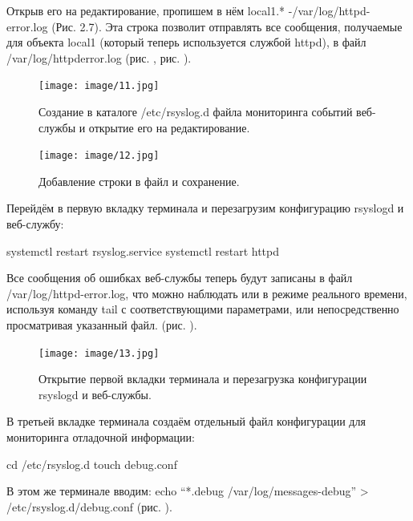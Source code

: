 \documentclass[
  english,
  russian,
  12pt,
  a4paper,
  DIV=11,
  numbers=noendperiod]{scrreprt}
\begin{document}
Открыв его на редактирование, пропишем в нём local1.*
-/var/log/httpd-error.log (Рис. 2.7). Эта строка позволит отправлять все
сообщения, получаемые для объекта local1 (который теперь используется
службой httpd), в файл /var/log/httpderror.log (рис.
\autocite*{fig:011}, рис. \autocite*{fig:012}).

\begin{figure}

{\centering \texttt{[image: image/11.jpg]}

}

\caption{Создание в каталоге /etc/rsyslog.d файла мониторинга событий
веб-службы и открытие его на редактирование.}

\end{figure}%

\begin{figure}

{\centering \texttt{[image: image/12.jpg]}

}

\caption{Добавление строки в файл и сохранение.}

\end{figure}%

Перейдём в первую вкладку терминала и перезагрузим конфигурацию rsyslogd
и веб-службу:

systemctl restart rsyslog.service systemctl restart httpd

Все сообщения об ошибках веб-службы теперь будут записаны в файл
/var/log/httpd-error.log, что можно наблюдать или в режиме реального
времени, используя команду tail с соответствующими параметрами, или
непосредственно просматривая указанный файл. (рис. \autocite*{fig:013}).

\begin{figure}

{\centering \texttt{[image: image/13.jpg]}

}

\caption{Открытие первой вкладки терминала и перезагрузка конфигурации
rsyslogd и веб-службы.}

\end{figure}%

В третьей вкладке терминала создаём отдельный файл конфигурации для
мониторинга отладочной информации:

cd /etc/rsyslog.d touch debug.conf

В этом же терминале вводим: echo ``*.debug /var/log/messages-debug''
\textgreater{} /etc/rsyslog.d/debug.conf (рис. \autocite*{fig:014}).
\end{document}
